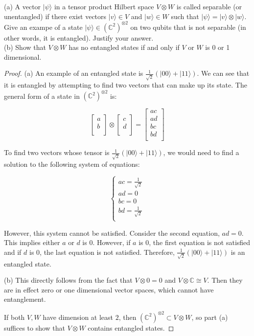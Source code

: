 \begin{problem}
	(a) A vector $|\psi\rangle$ in a tensor product Hilbert space $V \otimes W$ is called separable (or unentangled) if there exist vectors $|v\rangle \in V$ and $|w\rangle \in W$ such that $|\psi\rangle=|v\rangle \otimes|w\rangle$. Give an exampe of a state $|\psi\rangle \in\left(\mathbb{C}^2\right)^{\otimes 2}$ on two qubits that is not separable (in other words, it is entangled). Justify your answer.
	\\
(b) Show that $V \otimes W$ has no entangled states if and only if $V$ or $W$ is 0 or 1 dimensional.
\end{problem}
\begin{proof}
	(a)
An example of an entangled state is \(\frac{1}{\sqrt{2}}\left(|00\rangle + |11\rangle\right)\). We can see that it is entangled by attempting to find two vectors that can make up its state. The general form of a state in \((\mathbb{C}^2)^{\otimes 2}\) is:

\[
\begin{bmatrix} a \\ b \\ \end{bmatrix} \otimes \begin{bmatrix} c \\ d \\ \end{bmatrix} = \begin{bmatrix} ac \\ ad \\ bc \\ bd \\ \end{bmatrix}
\]

To find two vectors whose tensor is \(\frac{1}{\sqrt{2}}\left(|00\rangle + |11\rangle\right)\), we would need to find a solution to the following system of equations:

\[
\begin{cases}
    ac = \frac{1}{\sqrt{2}} \\
    ad = 0 \\
    bc = 0 \\
    bd = \frac{1}{\sqrt{2}} \\
\end{cases}
\]

However, this system cannot be satisfied. Consider the second equation, \(ad = 0\). This implies either \(a\) or \(d\) is 0. However, if \(a\) is 0, the first equation is not satisfied and if \(d\) is 0, the last equation is not satisfied. Therefore, \(\frac{1}{\sqrt{2}}\left(|00\rangle + |11\rangle\right)\) is an entangled state.

(b)
This directly follows from the fact that $V \otimes 0 = 0$ and $V \otimes \mathbb{C} \cong V$. Then they are in effect zero or one dimensional vector spaces, which cannot have entanglement. 

If both $V, W$ have dimension at least $2$, then $(\mathbb{C}^2)^{\otimes 2} \subset V \otimes W$, so part (a) suffices to show that $V \otimes W$ contains entangled states.

\end{proof}


